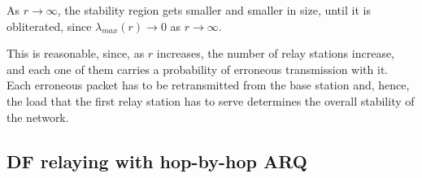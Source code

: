 As $r \to \infty$, the stability region gets smaller and smaller in size, until
it is obliterated, since $\lambda_{max}(r) \to 0$ as $r \to \infty$.

This is reasonable, since, as $r$ increases, the number of relay stations
increase, and each one of them carries a probability of erroneous transmission
with it. Each erroneous packet has to be retransmitted from the base station
and, hence, the load that the first relay station has to serve determines the
overall stability of the network.


\subsection{DF relaying with hop-by-hop ARQ}
